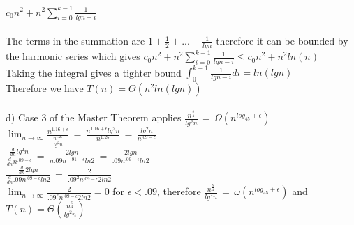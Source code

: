 \documentclass{article}
\begin{document}
$c_0n^2 + n^2\sum_{i=0}^{k-1}\frac{1}{lgn-i}$\\\\
The terms in the summation are $1+\frac{1}{2}+...+\frac{1}{lgn}$ therefore it can be bounded by the harmonic series which gives $c_0n^2 + n^2\sum_{i=0}^{k-1}\frac{1}{lgn-i}\leq c_0n^2+n^2ln(n)$\\
Taking the integral gives a tighter bound $\int_{0}^{k-1}\frac{1}{lgn-i}di=ln(lgn)$\\
Therefore we have $T(n)=\Theta(n^2ln(lgn))$\\\\
d) Case 3 of the Master Theorem applies $\frac{n^\frac{5}{4}}{lg^2n}\,=\,\Omega(n^{log_45+\epsilon})$\\
$\lim_{n \to \infty}\frac{n^{1.16+\epsilon}}{\frac{n^{1.25}}{lg^2n}}\,=\,\frac{n^{1.16+\epsilon}lg^2n}{n^{1.25}}\,=\,\frac{lg^2n}{n^{.09-\epsilon}}$\\
$\frac{\frac{d}{dn}lg^2n}{\frac{d}{dn}n^{.09-\epsilon}}\,=\,\frac{2lgn}{n.09n^{-.91-\epsilon}ln2}\,=\,\frac{2lgn}{.09n^{.09-\epsilon}ln2}$\\
$\frac{\frac{d}{dn}2lgn}{\frac{d}{dn}.09n^{.09-\epsilon}ln2}\,=\,\frac{2}{.09^2n^{.09-\epsilon}2ln2}$\\
$\lim_{n \to \infty}\frac{2}{.09^2n^{.09-\epsilon}2ln2}=0$ for $\epsilon<.09$, therefore $\frac{n^\frac{5}{4}}{lg^2n}\,=\,\omega(n^{log_45+\epsilon})$ and $T(n)=\Theta(\frac{n^\frac{5}{4}}{lg^2n})$\\
\end{document}
